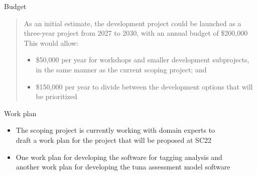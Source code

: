 \documentclass[aspectratio=169]{beamer}
\begin{document}
\begin{frame}{Budget}\small
  \\[2ex]
  \begin{quote}
    As an initial estimate, the development project could be launched as
    a\\[0.2ex]
    three-year project from 2027 to 2030, with an annual budget of
    {\darkgreen \$200,000}\\[2ex]
    This would allow:
    \begin{itemize}
      \item[] {\darkgreen \$50,000} per year for workshops and smaller
      development subprojects,\\[0.2ex]
      in the same manner as the current scoping project; and\\[2ex]
      \item[] {\darkgreen \$150,000} per year to divide between the development
      options that will\\[0.2ex]
      be prioritized
    \end{itemize}
  \end{quote}
\end{frame}


\begin{frame}{Work plan}\small
  \begin{itemize}
    \item[] The scoping project is currently working with domain
    experts to\\[0.2ex]
    draft a work plan for the project that will be proposed at SC22\\[4ex]
    \item[] One work plan for developing the {\darkgreen software for tagging
      analysis} and\\[0.2ex]
    another work plan for developing the {\darkgreen tuna assessment model
      software}
  \end{itemize}
\end{frame}

\end{document}
